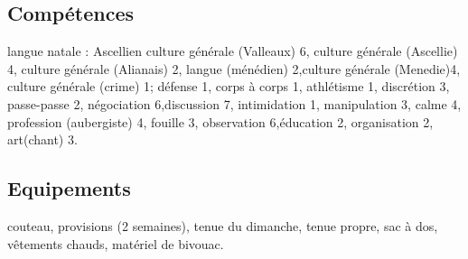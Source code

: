 \documentclass[10pt,a4paper]{article}
\begin{document}
\subsection{Compétences}
langue natale : Ascellien 
culture générale (Valleaux) 6, culture générale (Ascellie) 4, culture générale (Alianais) 2, langue (ménédien) 2,culture générale (Menedie)4, culture générale (crime) 1; défense 1, corps à corps 1, athlétisme 1, discrétion 3, passe-passe 2, négociation 6,discussion 7, intimidation 1, manipulation 3, calme 4, profession (aubergiste) 4, fouille 3, observation 6,éducation 2, organisation 2, art(chant) 3.
\subsection{Equipements}
couteau, provisions (2 semaines), tenue du dimanche, tenue propre, sac à dos, vêtements chauds, matériel de bivouac.
\end{document}
